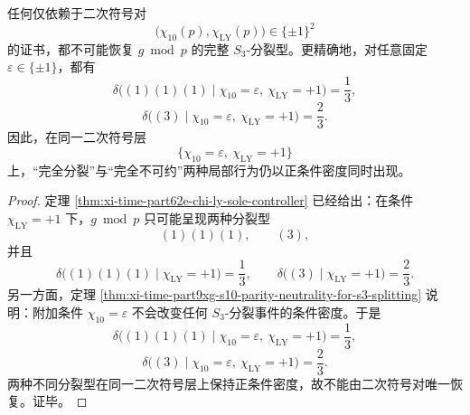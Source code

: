 \begin{corollary}\label{cor:xi-time-part9xg-quadratic-sign-pair-cannot-recover-full-s3-type}
任何仅依赖于二次符号对
\[
\bigl(\chi_{10}(p),\chi_{\mathrm{LY}}(p)\bigr)\in\{\pm1\}^2
\]
的证书，都不可能恢复 \(g\bmod p\) 的完整 \(S_3\)-分裂型。更精确地，对任意固定 \(\varepsilon\in\{\pm1\}\)，都有
\[
\delta\!\bigl((1)(1)(1)\mid \chi_{10}=\varepsilon,\ \chi_{\mathrm{LY}}=+1\bigr)=\frac13,
\]
\[
\delta\!\bigl((3)\mid \chi_{10}=\varepsilon,\ \chi_{\mathrm{LY}}=+1\bigr)=\frac23.
\]
因此，在同一二次符号层
\[
\{\chi_{10}=\varepsilon,\ \chi_{\mathrm{LY}}=+1\}
\]
上，“完全分裂”与“完全不可约”两种局部行为仍以正条件密度同时出现。
\end{corollary}
\begin{proof}
定理 \ref{thm:xi-time-part62e-chi-ly-sole-controller} 已经给出：在条件 \(\chi_{\mathrm{LY}}=+1\) 下，\(g\bmod p\) 只可能呈现两种分裂型
\[
(1)(1)(1),\qquad (3),
\]
并且
\[
\delta\!\bigl((1)(1)(1)\mid \chi_{\mathrm{LY}}=+1\bigr)=\frac13,
\qquad
\delta\!\bigl((3)\mid \chi_{\mathrm{LY}}=+1\bigr)=\frac23.
\]
另一方面，定理 \ref{thm:xi-time-part9xg-s10-parity-neutrality-for-s3-splitting} 说明：附加条件 \(\chi_{10}=\varepsilon\) 不会改变任何 \(S_3\)-分裂事件的条件密度。于是
\[
\delta\!\bigl((1)(1)(1)\mid \chi_{10}=\varepsilon,\ \chi_{\mathrm{LY}}=+1\bigr)=\frac13,
\]
\[
\delta\!\bigl((3)\mid \chi_{10}=\varepsilon,\ \chi_{\mathrm{LY}}=+1\bigr)=\frac23.
\]
两种不同分裂型在同一二次符号层上保持正条件密度，故不能由二次符号对唯一恢复。证毕。
\end{proof}

